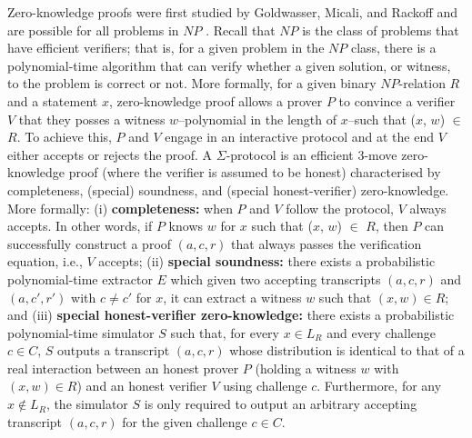 \documentclass[sigconf, anonymous]{acmart}
\begin{document}
Zero-knowledge proofs were first studied by Goldwasser, Micali, and Rackoff \cite{10.1145/22145.22178} and 
are possible for all problems in $NP$ \cite{10.1145/116825.116852}. Recall that $NP$ is the class of 
problems that have efficient verifiers; that is, for a given problem in the $NP$ class, there is 
a polynomial-time algorithm that can verify whether a given solution, or witness, to the problem is correct or not.
More formally, for a given binary $NP$-relation $R$ and a statement $x$, zero-knowledge proof allows a prover 
$P$ to convince a verifier $V$ that they posses a witness $w$--polynomial in the length of $x$--such 
that ($x$, $w$) $\in$ $R$. To achieve this, $P$ and $V$ engage in an 
interactive protocol and at the end $V$ either accepts or rejects the proof.
A $\Sigma$-protocol is an efficient 3-move zero-knowledge proof (where the 
verifier is assumed to be honest) characterised by completeness, (special) soundness, and 
(special honest-verifier) zero-knowledge. More formally: (i) \textbf{completeness:}
  when $P$ and $V$ follow the protocol, $V$ always accepts. 
  In other words, if $P$ knows $w$ for $x$ such that ($x$, $w$) $\in$ $R$,  
  then $P$ can successfully construct a proof $(a, c, r)$ that always passes the verification equation, 
  i.e., $V$ accepts; (ii) \textbf{special soundness:}
there exists a probabilistic polynomial-time extractor $E$ which given 
two accepting transcripts $(a, c, r)$ and $(a, c', r')$ with $c\neq c'$ for $x$, 
it can extract a witness $w$ such that $(x, w) \in R$; and (iii) \textbf{special honest-verifier zero-knowledge:}
there exists a probabilistic polynomial-time simulator \(S\) such that, for every \(x \in L_R\) and every challenge \(c \in C\), \(S\) outputs a transcript \((a,c,r)\) whose distribution is identical to that of a real interaction between an honest prover \(P\) (holding a witness \(w\) with \((x,w)\in R\)) and an honest verifier \(V\) using challenge $c$. Furthermore, for any \(x \notin L_R\), the simulator \(S\) is only required to output an arbitrary accepting transcript \((a,c,r)\) for the given challenge \(c \in C\).
\end{document}
